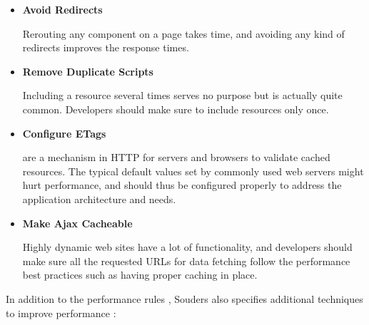 \begin{itemize}
\item \textbf{Avoid Redirects}

  Rerouting any component on a page takes time, and avoiding any kind
  of redirects improves the response times.

\item \textbf{Remove Duplicate Scripts}

  Including a resource several times serves no purpose but is actually
  quite common. Developers should make sure to include resources only
  once.

\item \textbf{Configure ETags}

   are a mechanism in HTTP for servers and browsers to
  validate cached resources. The typical default values set by
  commonly used web servers might hurt performance, and should thus be
  configured properly to address the application architecture and
  needs.

\item \textbf{Make Ajax Cacheable}

  Highly dynamic web sites have a lot of 
  \cite{garrett2005ajax} functionality, and developers should make
  sure all the requested URLs for data fetching follow the performance
  best practices such as having proper caching in place.

\end{itemize}

In addition to the performance rules \cite{souders2007high}, Souders
also specifies additional techniques to improve performance
\cite{souders2009even}:

